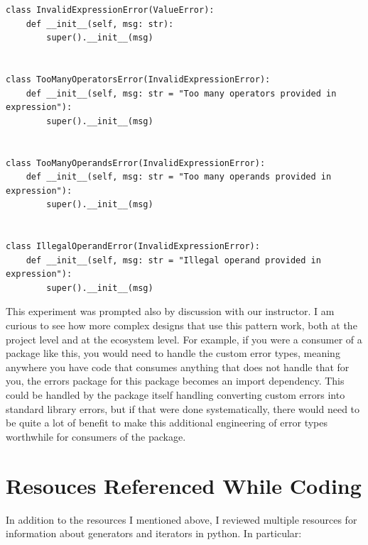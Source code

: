 \documentclass[10pt,letterpaper,final]{report}
\begin{document}
\begin{verbatim}
class InvalidExpressionError(ValueError):
    def __init__(self, msg: str):
        super().__init__(msg)


class TooManyOperatorsError(InvalidExpressionError):
    def __init__(self, msg: str = "Too many operators provided in expression"):
        super().__init__(msg)


class TooManyOperandsError(InvalidExpressionError):
    def __init__(self, msg: str = "Too many operands provided in expression"):
        super().__init__(msg)


class IllegalOperandError(InvalidExpressionError):
    def __init__(self, msg: str = "Illegal operand provided in expression"):
        super().__init__(msg)
\end{verbatim}

This experiment was prompted also by discussion with our instructor. I am curious to see how more complex designs that use this pattern work, both at the project level and at the ecosystem level. For example, if you were a consumer of a package like this, you would need to handle the custom error types, meaning anywhere you have code that consumes anything that does not handle that for you, the errors package for this package becomes an import dependency. This could be handled by the package itself handling converting custom errors into standard library errors, but if that were done systematically, there would need to be quite a lot of benefit to make this additional engineering of error types worthwhile for consumers of the package.

\pagebreak

\section{Resouces Referenced While Coding}

In addition to the resources I mentioned above, I reviewed multiple resources for information about generators and iterators in python. In particular:
\end{document}
